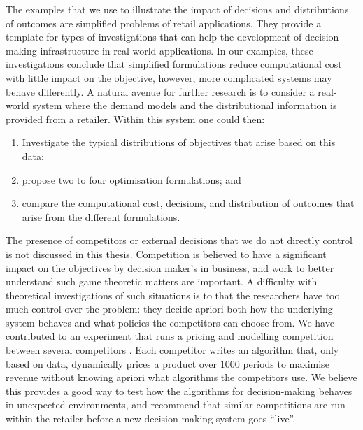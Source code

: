\documentclass[main.tex]{subfiles}
\begin{document}
The examples that we use to illustrate the impact of decisions and
distributions of outcomes are simplified problems of retail
applications. They provide a template for types of investigations that
can help the development of decision making infrastructure in
real-world applications.  In our examples, these investigations
conclude that simplified formulations reduce computational cost with
little impact on the objective, however, more complicated systems may
behave differently.  A natural avenue for further research is to
consider a real-world system where the demand models and the
distributional information is provided from a retailer. Within this
system one could then:
\begin{enumerate}
\item Investigate the typical distributions of objectives that arise
  based on this data;
\item propose two to four optimisation formulations; and
\item compare the computational cost, decisions, and distribution of
  outcomes that arise from the different formulations.
\end{enumerate}

The presence of competitors or external decisions that we do not
directly control is not discussed in this thesis. Competition is
believed to have a significant impact on the objectives by decision
maker's in business, and work to better understand such game theoretic
matters are important. A difficulty with theoretical investigations of
such situations is to that the researchers have too much control over
the problem: they decide apriori both how the underlying system
behaves and what policies the competitors can choose from.  We have
contributed to an experiment that runs a pricing and modelling
competition between several competitors \citep{geer2018dynamic}.  Each
competitor writes an algorithm that, only based on data, dynamically
prices a product over \num{1000} periods to maximise revenue without
knowing apriori what algorithms the competitors use. We believe this
provides a good way to test how the algorithms for decision-making
behaves in unexpected environments, and recommend that similar
competitions are run within the retailer before a new decision-making
system goes ``live''.



\biblio{} %
\end{document}
